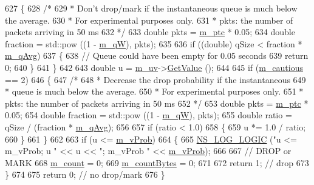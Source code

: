 \begin{DoxyCode}
627     \{
628       \textcolor{comment}{/*}
629 \textcolor{comment}{       * Don't drop/mark if the instantaneous queue is much below the average.}
630 \textcolor{comment}{       * For experimental purposes only.}
631 \textcolor{comment}{       * pkts: the number of packets arriving in 50 ms}
632 \textcolor{comment}{       */}
633       \textcolor{keywordtype}{double} pkts = \hyperlink{classns3_1_1RedQueueDisc_aa0e1d78172897574d39e59b873ec9401}{m\_ptc} * 0.05;
634       \textcolor{keywordtype}{double} fraction = std::pow ((1 - \hyperlink{classns3_1_1RedQueueDisc_aed406d18723a07fe991497553abed6da}{m\_qW}), pkts);
635 
636       \textcolor{keywordflow}{if} ((\textcolor{keywordtype}{double}) qSize < fraction * \hyperlink{classns3_1_1RedQueueDisc_ad51f583bf9d9964833fd8a710a40e247}{m\_qAvg})
637         \{
638           \textcolor{comment}{// Queue could have been empty for 0.05 seconds}
639           \textcolor{keywordflow}{return} 0;
640         \}
641     \}
642 
643   \textcolor{keywordtype}{double} u = \hyperlink{classns3_1_1RedQueueDisc_ac8e5d222b2cbd02e3e940e129f36c76c}{m\_uv}->\hyperlink{classns3_1_1UniformRandomVariable_a03822d8c86ac51e9aa83bbc73041386b}{GetValue} ();
644 
645   \textcolor{keywordflow}{if} (\hyperlink{classns3_1_1RedQueueDisc_a2156a26538fe0259220ca9e57c829c34}{m\_cautious} == 2)
646     \{
647       \textcolor{comment}{/*}
648 \textcolor{comment}{       * Decrease the drop probability if the instantaneous}
649 \textcolor{comment}{       * queue is much below the average.}
650 \textcolor{comment}{       * For experimental purposes only.}
651 \textcolor{comment}{       * pkts: the number of packets arriving in 50 ms}
652 \textcolor{comment}{       */}
653       \textcolor{keywordtype}{double} pkts = \hyperlink{classns3_1_1RedQueueDisc_aa0e1d78172897574d39e59b873ec9401}{m\_ptc} * 0.05;
654       \textcolor{keywordtype}{double} fraction = std::pow ((1 - \hyperlink{classns3_1_1RedQueueDisc_aed406d18723a07fe991497553abed6da}{m\_qW}), pkts);
655       \textcolor{keywordtype}{double} ratio = qSize / (fraction * \hyperlink{classns3_1_1RedQueueDisc_ad51f583bf9d9964833fd8a710a40e247}{m\_qAvg});
656 
657       \textcolor{keywordflow}{if} (ratio < 1.0)
658         \{
659           u *= 1.0 / ratio;
660         \}
661     \}
662 
663   \textcolor{keywordflow}{if} (u <= \hyperlink{classns3_1_1RedQueueDisc_aa24ff74b774ceb929bc49fe289fbf31c}{m\_vProb})
664     \{
665       \hyperlink{group__logging_ga88acd260151caf2db9c0fc84997f45ce}{NS\_LOG\_LOGIC} (\textcolor{stringliteral}{"u <= m\_vProb; u "} << u << \textcolor{stringliteral}{"; m\_vProb "} << 
      \hyperlink{classns3_1_1RedQueueDisc_aa24ff74b774ceb929bc49fe289fbf31c}{m\_vProb});
666 
667       \textcolor{comment}{// DROP or MARK}
668       \hyperlink{classns3_1_1RedQueueDisc_ac096c7624d6d921f4612e6e1852193f7}{m\_count} = 0;
669       \hyperlink{classns3_1_1RedQueueDisc_a7bcb375212b9757440dd9cf3e8f1ab5b}{m\_countBytes} = 0;
671 
672       \textcolor{keywordflow}{return} 1; \textcolor{comment}{// drop}
673     \}
674 
675   \textcolor{keywordflow}{return} 0; \textcolor{comment}{// no drop/mark}
676 \}
\end{DoxyCode}


